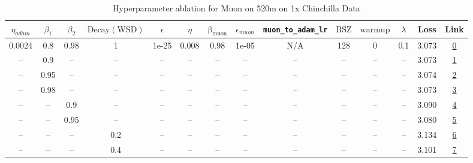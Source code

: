 \begin{table}[H]
\centering
\caption{Hyperparameter ablation for Muon on 520m on 1x Chinchilla Data}
\label{tab:ablation_muon_520m_1}
\begin{tabular}{cccccccccccccc}
\toprule
$\eta_{adam}$ & $\beta_1$ & $\beta_2$ & $\mathrm{Decay (WSD)}$ & $\epsilon$ & $\eta$ & $\mathrm{\beta_{muon}}$ & $\epsilon_{muon}$ & \texttt{muon\_to\_adam\_lr} & $\mathrm{BSZ}$ & $\mathrm{warmup}$ & $\lambda$ & Loss & Link \\
\midrule
0.0024 & 0.8 & 0.98 & 1 & 1e-25 & 0.008 & 0.98 & 1e-05 & N/A & 128 & 0 & 0.1 & 3.073 & \href{https://wandb.ai/stanford-mercury/optimizer-scaling/runs/sweep-520m-10B-muonb6462flr0.008-wd0.1-minlr0-warmup0-b10.8-b20.-bb54fc}{0} \\
\midrule
-- & 0.9 & -- & -- & -- & -- & -- & -- & -- & -- & -- & -- & 3.073 & \href{https://wandb.ai/stanford-mercury/optimizer-scaling/runs/sweep-520m-10B-muon3aa627lr0.008-wd0.1-minlr0-warmup0-b10.9-b20.-d88a74}{1} \\
-- & 0.95 & -- & -- & -- & -- & -- & -- & -- & -- & -- & -- & 3.074 & \href{https://wandb.ai/stanford-mercury/optimizer-scaling/runs/sweep-520m-10B-muon6de49alr0.008-wd0.1-minlr0-warmup0-b10.95-b20-09ab54}{2} \\
-- & 0.98 & -- & -- & -- & -- & -- & -- & -- & -- & -- & -- & 3.073 & \href{https://wandb.ai/stanford-mercury/optimizer-scaling/runs/sweep-520m-10B-muon73c7eelr0.008-wd0.1-minlr0-warmup0-b10.98-b20-25814b}{3} \\
-- & -- & 0.9 & -- & -- & -- & -- & -- & -- & -- & -- & -- & 3.090 & \href{https://wandb.ai/stanford-mercury/optimizer-scaling/runs/sweep-520m-10B-muon076a83lr0.008-wd0.1-minlr0-warmup0-b10.8-b20.-d5cd2a}{4} \\
-- & -- & 0.95 & -- & -- & -- & -- & -- & -- & -- & -- & -- & 3.080 & \href{https://wandb.ai/stanford-mercury/optimizer-scaling/runs/sweep-520m-10B-muon43dc84lr0.008-wd0.1-minlr0-warmup0-b10.8-b20.-b11016}{5} \\
-- & -- & -- & 0.2 & -- & -- & -- & -- & -- & -- & -- & -- & 3.134 & \href{https://wandb.ai/stanford-mercury/optimizer-scaling/runs/sweep-520m-10B-muon7bf1dalr0.008-wd0.1-minlr0-warmup0-b10.8-b20.-0591da}{6} \\
-- & -- & -- & 0.4 & -- & -- & -- & -- & -- & -- & -- & -- & 3.101 & \href{https://wandb.ai/stanford-mercury/optimizer-scaling/runs/sweep-520m-10B-muon38778flr0.008-wd0.1-minlr0-warmup0-b10.8-b20.-a2dc9e}{7} \\

\end{tabular}
\end{table}
